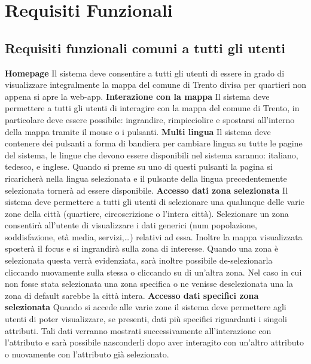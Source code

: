 \chapter{Requisiti Funzionali} 
    \section{Requisiti funzionali comuni a tutti gli utenti}
        \begin{rfList}
            \rfItem \textbf{Homepage} Il sistema deve consentire a tutti gli utenti di essere in grado di visualizzare integralmente la mappa del comune di Trento divisa per quartieri non appena si apre la web-app.
            \rfItem \textbf{Interazione con la mappa} Il sistema deve permettere a tutti gli utenti di interagire con la mappa del comune di Trento, in particolare deve essere possibile: ingrandire, rimpicciolire e spostarsi all'interno della mappa tramite il mouse o i pulsanti.
            \rfItem \textbf{Multi lingua} Il sistema deve contenere dei pulsanti a forma di bandiera per cambiare lingua su tutte le pagine del sistema, le lingue che devono essere disponibili nel sistema saranno: italiano, tedesco, e inglese. Quando si preme su uno di questi pulsanti la pagina si ricaricherà nella lingua selezionata e il pulsante della lingua precedentemente selezionata tornerà ad essere disponibile.
            \rfItem \textbf{Accesso dati zona selezionata} Il sistema deve permettere a tutti gli utenti di selezionare una qualunque delle varie zone della città (quartiere, circoscrizione o l'intera città). Selezionare un zona consentirà all'utente di visualizzare i dati generici (num popolazione, soddisfazione, età media, servizi,\dots) relativi ad essa. Inoltre la mappa visualizzata sposterà il focus e si ingrandirà sulla zona di interesse. Quando una zona è selezionata questa verrà evidenziata, sarà inoltre possibile de-selezionarla cliccando nuovamente sulla stessa o cliccando su di un'altra zona. Nel caso in cui non fosse stata selezionata una zona specifica o ne venisse deselezionata una la zona di default sarebbe la città intera.
            \rfItem \textbf{Accesso dati specifici zona selezionata} Quando si accede alle varie zone il sistema deve permettere agli utenti di poter visualizzare, se presenti, dati più specifici riguardanti i singoli attributi. Tali dati verranno mostrati successivamente all'interazione con l'attributo e sarà possibile nasconderli dopo aver interagito con un'altro attributo o nuovamente con l'attributo già selezionato.
        \end{rfList} 
